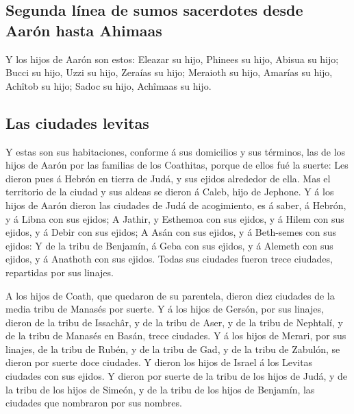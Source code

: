 \hypertarget{segunda-luxednea-de-sumos-sacerdotes-desde-aaruxf3n-hasta-ahimaas}{%
\subsection{Segunda línea de sumos sacerdotes desde Aarón hasta
Ahimaas}\label{segunda-luxednea-de-sumos-sacerdotes-desde-aaruxf3n-hasta-ahimaas}}

 Y los hijos de Aarón son estos: Eleazar su hijo, Phinees
su hijo, Abisua su hijo;  Bucci su hijo, Uzzi su hijo,
Zeraías su hijo;  Meraioth su hijo, Amarías su hijo,
Achîtob su hijo;  Sadoc su hijo, Achîmaas su hijo.

\hypertarget{las-ciudades-levitas}{%
\subsection{Las ciudades levitas}\label{las-ciudades-levitas}}

 Y estas son sus habitaciones, conforme á sus domicilios
y sus términos, las de los hijos de Aarón por las familias de los
Coathitas, porque de ellos fué la suerte:  Les dieron
pues á Hebrón en tierra de Judá, y sus ejidos alrededor de ella.
 Mas el territorio de la ciudad y sus aldeas se dieron á
Caleb, hijo de Jephone.  Y á los hijos de Aarón dieron
las ciudades de Judá de acogimiento, es á saber, á Hebrón, y á Libna con
sus ejidos;  A Jathir, y Esthemoa con sus ejidos, y á
Hilem con sus ejidos, y á Debir con sus ejidos;  A Asán
con sus ejidos, y á Beth-semes con sus ejidos:  Y de la
tribu de Benjamín, á Geba con sus ejidos, y á Alemeth con sus ejidos, y
á Anathoth con sus ejidos. Todas sus ciudades fueron trece ciudades,
repartidas por sus linajes.

 A los hijos de Coath, que quedaron de su parentela,
dieron diez ciudades de la media tribu de Manasés por suerte.
 Y á los hijos de Gersón, por sus linajes, dieron de la
tribu de Issachâr, y de la tribu de Aser, y de la tribu de Nephtalí, y
de la tribu de Manasés en Basán, trece ciudades.  Y á los
hijos de Merari, por sus linajes, de la tribu de Rubén, y de la tribu de
Gad, y de la tribu de Zabulón, se dieron por suerte doce ciudades.
 Y dieron los hijos de Israel á los Levitas ciudades con
sus ejidos.  Y dieron por suerte de la tribu de los hijos
de Judá, y de la tribu de los hijos de Simeón, y de la tribu de los
hijos de Benjamín, las ciudades que nombraron por sus nombres.

